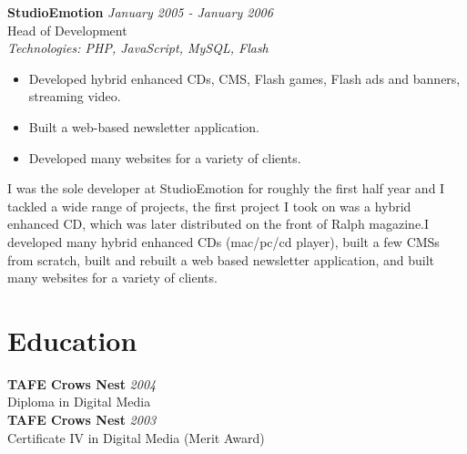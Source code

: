 \documentclass[a4paper,10pt]{article}
\begin{document}
\vspace{1em}

\textbf{StudioEmotion} \hfill \textit{January 2005 - January 2006} \\
Head of Development \\
\textit{Technologies: PHP, JavaScript, MySQL, Flash}
\begin{itemize}
    \item Developed hybrid enhanced CDs, CMS, Flash games, Flash ads and banners, streaming video.
    \item Built a web-based newsletter application.
    \item Developed many websites for a variety of clients.
\end{itemize}

I was the sole developer at StudioEmotion for roughly the first half year and I tackled a wide range of projects, the first project I took on was a hybrid enhanced CD, which was later distributed on the front of Ralph magazine.I developed many hybrid enhanced CDs (mac/pc/cd player), built a few CMSs from scratch, built and rebuilt a web based newsletter application, and built many websites for a variety of clients.

\section*{Education}

\textbf{TAFE Crows Nest} \hfill \textit{2004} \\
Diploma in Digital Media \\
\textbf{TAFE Crows Nest} \hfill \textit{2003} \\
Certificate IV in Digital Media (Merit Award)
\end{document}
